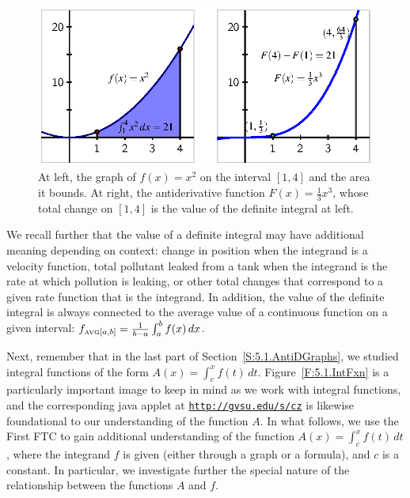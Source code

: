 \begin{figure}[h]
\begin{center}
\includegraphics{figures/5_2_Intro.eps}
\end{center}
\caption{At left, the graph of $f(x) = x^2$ on the interval $[1,4]$ and the area it bounds.  At right, the antiderivative function $F(x) = \frac{1}{3}x^3$, whose total change on $[1,4]$ is the value of the definite integral at left.} \label{F:5.2.Intro}
\end{figure}

We recall further that the value of a definite integral may have additional meaning depending on context:  change in position when the integrand is a velocity function, total pollutant leaked from a tank when the integrand is the rate at which pollution is leaking, or other total changes that correspond to a given rate function that is the integrand.  In addition, the value of the definite integral is always connected to the average value of a continuous function on a given interval:  $f_{\mbox{\tiny{AVG}}[a,b]} = \frac{1}{b-a} \int_a^b f(x) \, dx$.

Next, remember that in the last part of Section~\ref{S:5.1.AntiDGraphs}, we studied integral functions of the form $A(x) = \int_c^x f(t) \, dt$.  Figure~\ref{F:5.1.IntFxn} is a particularly important image to keep in mind as we work with integral functions, and the corresponding java applet at \href{http://gvsu.edu/s/cz}{\texttt{http://gvsu.edu/s/cz}} is likewise foundational to our understanding of the function $A$.  In what follows, we use the First FTC to gain additional understanding of the function $A(x) = \int_c^x f(t) \, dt$, where the integrand $f$ is given (either through a graph or a formula), and $c$ is a constant.  In particular, we investigate further the special nature of the relationship between the functions $A$ and $f$.	



